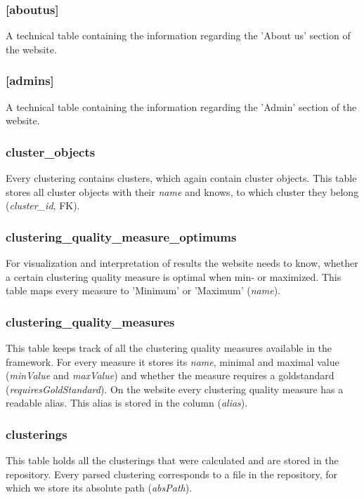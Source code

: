 	\subsubsection{[aboutus]}
	A technical table containing the information regarding the 'About us' section of the website.
	\subsubsection{[admins]}
	A technical table containing the information regarding the 'Admin' section of the website.
	\subsubsection{cluster\_objects}
	Every clustering contains clusters, which again contain cluster objects. This table stores all cluster objects with their \textit{name} and knows, to which cluster they belong (\textit{cluster\_id}, FK).

		\subsubsection{clustering\_quality\_measure\_optimums} For visualization and interpretation of results the website needs to know, whether a certain clustering quality measure is optimal when min- or maximized. This table maps every measure to 'Minimum' or 'Maximum' (\textit{name}).
		
		\subsubsection{clustering\_quality\_measures                                  } This table keeps track of all the clustering quality measures available in the framework. For every measure it stores its \textit{name}, minimal and maximal value (\textit{minValue} and \textit{maxValue}) and whether the measure requires a goldstandard (\textit{requiresGoldStandard}). On the website every clustering quality measure has a readable alias. This alias is stored in the column (\textit{alias}).
	
		
		\subsubsection{clusterings                                                  } This table holds all the clusterings that were calculated and are stored in the repository. Every parsed clustering corresponds to a file in the repository, for which we store its absolute path (\textit{absPath}).
		
